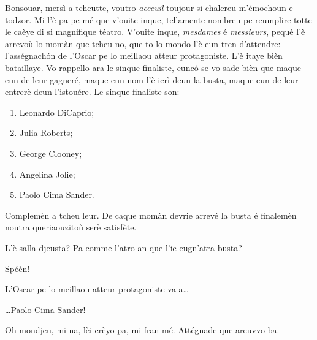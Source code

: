\begin{drama}
\Conducteurspeaks Bonsouar, mersì a tcheutte, voutro \textit{acceuil} toujour si chalereu m'émochoun-e todzor. Mi l'è pa pe mé que v'ouite inque, tellamente nombreu pe reumplire totte le caèye di si magnifique téatro. V'ouite inque, \textit{mesdames} é \textit{messieurs}, pequé l'è arrevoù lo momàn que tcheu no, que to lo mondo l'è eun tren d'attendre: l'asségnach\'on de l'Oscar pe lo meillaou atteur protagoniste. L'è itaye bièn bataillaye. Vo rappello ara le sinque finaliste, euncó se vo sade bièn que maque eun de leur gagneré, maque eun nom l'è icrì deun la busta, maque eun de leur entrerè deun l'istouére. Le sinque finaliste son:
\begin{enumerate}
\item Leonardo DiCaprio;
\item Julia Roberts;
\item George Clooney;
\item Angelina Jolie;
\item Paolo Cima Sander.
\end{enumerate}

Complemèn a tcheu leur. De caque momàn devrie arrevé la busta é finalemèn noutra queriaouzitoù serè satisfète.


\Conducteurspeaks{} L'è salla djeusta? Pa comme l'atro an que l'ie eugn'atra busta?

\Vallettaspeaks Spéèn!

\Conducteurspeaks L'Oscar pe lo meillaou atteur protagoniste va a\ldots


\Conducteurspeaks \ldots Paolo Cima Sander!


\Cimaspeaks{} Oh mondjeu, mi na, lèi crèyo pa, mi fran mé. Attégnade que areuvvo ba. 


\label{katchi}



\end{drama}
